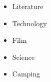 \documentclass[10pt,a4paper]{altacv}
\begin{document}
\begin{itemize}
\item Literature

\item Technology

\item Film

\item Science

\item Camping
\end{itemize}

\divider

\medskip

\clearpage


\end{document}
